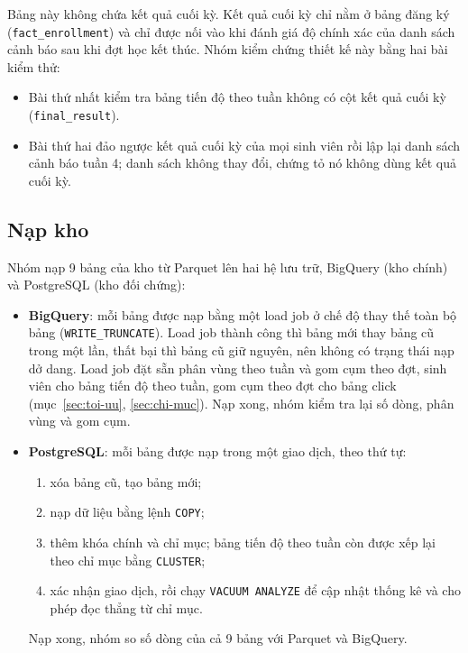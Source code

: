 Bảng này không chứa kết quả cuối kỳ. Kết quả cuối kỳ chỉ nằm ở bảng đăng ký
(\texttt{fact\_enrollment}) và chỉ được nối vào khi đánh giá độ chính xác của danh sách cảnh
báo sau khi đợt học kết thúc. Nhóm kiểm chứng thiết kế này bằng hai bài kiểm thử:
\begin{itemize}
  \item Bài thứ nhất kiểm tra bảng tiến độ theo tuần không có cột kết quả cuối kỳ
        (\texttt{final\_result}).
  \item Bài thứ hai đảo ngược kết quả cuối kỳ của mọi sinh viên rồi lập lại danh sách cảnh báo tuần 4; danh sách không thay đổi, chứng tỏ nó không dùng kết quả cuối kỳ.
\end{itemize}

\subsection{Nạp kho}
\label{sec:nap-kho}

Nhóm nạp 9 bảng của kho từ Parquet lên hai hệ lưu trữ, BigQuery (kho chính) và PostgreSQL (kho đối chứng):
\begin{itemize}
  \item \textbf{BigQuery}: mỗi bảng được nạp bằng một load job ở chế độ thay thế toàn bộ bảng
        (\texttt{WRITE\_TRUNCATE}). Load job thành công thì bảng mới thay bảng cũ trong một lần,
        thất bại thì bảng cũ giữ nguyên, nên không có trạng thái nạp dở dang. Load job đặt sẵn
        phân vùng theo tuần và gom cụm theo đợt, sinh viên cho bảng tiến độ theo tuần, gom cụm
        theo đợt cho bảng click (mục~\ref{sec:toi-uu}, \ref{sec:chi-muc}). Nạp xong, nhóm kiểm
        tra lại số dòng, phân vùng và gom cụm.
  \item \textbf{PostgreSQL}: mỗi bảng được nạp trong một giao dịch, theo thứ tự:
        \begin{enumerate}
          \item xóa bảng cũ, tạo bảng mới;
          \item nạp dữ liệu bằng lệnh \texttt{COPY};
          \item thêm khóa chính và chỉ mục; bảng tiến độ theo tuần còn được xếp lại theo chỉ mục
                bằng \texttt{CLUSTER};
          \item xác nhận giao dịch, rồi chạy \texttt{VACUUM ANALYZE} để cập nhật thống kê và cho
                phép đọc thẳng từ chỉ mục.
        \end{enumerate}
        Nạp xong, nhóm so số dòng của cả 9 bảng với Parquet và BigQuery.
\end{itemize}


